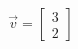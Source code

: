 \documentclass[preview]{standalone}
\begin{document}
\begin{align*}
\vec{v} = \begin{bmatrix} 3 \\ 2 \end{bmatrix}
\end{align*}
\end{document}
